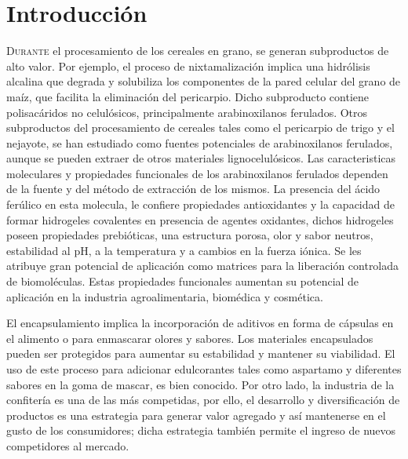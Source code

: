 \chapter*{Introducción}
\lettrine{D}{urante} el procesamiento de los cereales en grano, se generan subproductos de alto valor. Por ejemplo, el proceso de nixtamalización implica una hidrólisis alcalina que degrada y solubiliza los componentes de la pared celular del grano de maíz, que facilita la eliminación del pericarpio. Dicho subproducto contiene polisacáridos no celulósicos, principalmente arabinoxilanos ferulados. Otros subproductos del procesamiento de cereales tales como el pericarpio de trigo y el nejayote, se han estudiado como fuentes potenciales de arabinoxilanos ferulados, aunque se pueden extraer de otros materiales lignocelulósicos. Las caracteristicas moleculares y propiedades funcionales de los arabinoxilanos ferulados dependen de la fuente y del método de extracción de los mismos. La presencia del ácido ferúlico en esta molecula, le confiere propiedades antioxidantes y la capacidad de formar hidrogeles covalentes en presencia de agentes oxidantes, dichos hidrogeles poseen propiedades prebióticas, una estructura porosa, olor y sabor neutros, estabilidad al pH, a la temperatura y a cambios en la fuerza iónica. Se les atribuye gran potencial de aplicación como matrices para la liberación controlada de biomoléculas. Estas propiedades funcionales aumentan su potencial de aplicación en la industria agroalimentaria, biomédica y cosmética. 

El encapsulamiento implica la incorporación de aditivos en forma de cápsulas en el alimento o para enmascarar olores y sabores. Los materiales encapsulados pueden ser protegidos para aumentar su estabilidad y mantener su viabilidad. El uso de este proceso para adicionar edulcorantes tales como aspartamo y diferentes sabores en la goma de mascar, es bien conocido. Por otro lado, la industria de la confitería es una de las más competidas, por ello, el desarrollo y diversificación de productos es una estrategia para generar valor agregado y así mantenerse en el gusto de los consumidores; dicha estrategia también permite el ingreso de nuevos competidores al mercado. 


